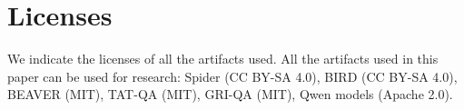\section{Licenses}
\label{app:license}
We indicate the licenses of all the artifacts used. All the artifacts used in this paper can be used for research: Spider (CC BY-SA 4.0), BIRD (CC BY-SA 4.0), BEAVER (MIT), TAT-QA (MIT), GRI-QA (MIT), Qwen models (Apache 2.0).